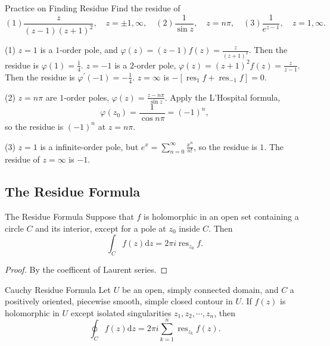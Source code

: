 \begin{example}{Practice on Finding Residue}{}
  Find the residue of
  \begin{equation}
    (1) \frac{z}{(z-1)(z+1)^2}, \quad z = \pm 1, \infty, \quad
    (2) \frac{1}{\sin z}, \quad z = n \pi, \quad
    (3) \frac{1}{e^{z-1}}, \quad z = 1, \infty.
  \end{equation}
\end{example}

\begin{solution}
  (1) $z = 1$ is a $1$-order pole, and $\varphi(z) = (z-1)f(z)= \frac{z}{(z+1)^2}$.
  Then the residue is $\varphi(1) = \frac{1}{4}$.
  $z = -1$ is a $2$-order pole, $\varphi(z) = (z+1)^2f(z) = \frac{z}{z-1}$.
  Then the residue is $\varphi^{\prime}(-1) = - \frac{1}{4}$.
  $z = \infty$ is $- [\operatorname{res}_1f + \operatorname{res}_{-1}f] = 0$.

  (2) $z = n\pi$ are $1$-order poles, $\varphi(z) = \frac{z - n\pi}{\sin z}$.
  Apply the L'Hospital formula,
  \begin{equation}
    \varphi(z_0) = \frac{1}{\cos n\pi } = (-1)^n,
  \end{equation}
  so the residue is $(-1)^n$ at $z = n \pi$.

  (3) $z = 1$ is a infinite-order pole, but $e^x = \sum _{n = 0}^{\infty} \frac{x^n}{n!}$,
  so the residue is $1$.
  The residue of $z = \infty$ is $-1$.
\end{solution}

\subsection{The Residue Formula}

\begin{theorem}{The Residue Formula}{}
  Suppose that $f$ is holomorphic in an open set containing a circle $C$
  and its interior, except for a pole at $z_0$ inside $C$. Then
  \begin{equation}
    \int_C f(z)\mathrm{d} z
    =
    2 \pi i\operatorname{res}_{z_0} f.
  \end{equation}
\end{theorem}

\begin{proof}
  By the coefficent of Laurent series.
\end{proof}

\begin{corollary}{Cauchy Residue Formula}{}
  Let $U$ be an open, simply connected domain, and $C$ a positively oriented, piecewise smooth,
  simple closed contour in $U$.
  If $f(z)$ is holomorphic in $U$ except isolated singularities $z_1,z_2,\cdots,z_n$, then
  \begin{equation}
    \oint_C f(z)\mathrm{d} z
    =
    2 \pi i \sum\limits_{k = 1}^n \operatorname{res}_{z_k}f(z).
  \end{equation}
\end{corollary}

